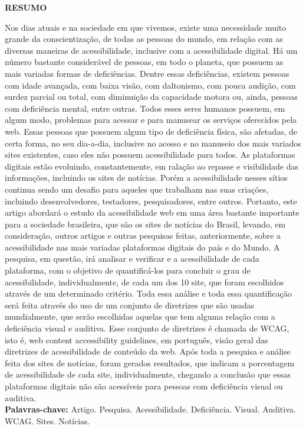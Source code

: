 \documentclass[a4paper]{article}
\begin{document}
\begin{titlepage}
	\begin{center}
		{\large \textbf{RESUMO}}\\[1cm]
	\end{center}
	Nos dias atuais e na sociedade em que vivemos, existe uma necessidade muito grande da conscientização, de todas as pessoas do mundo, em relação com as diversas maneiras de acessibilidade, inclusive com a acessibilidade digital. Há um número bastante considerável de pessoas, em todo o planeta, que possuem as mais variadas formas de deficiências. Dentre essas deficiências, existem pessoas com idade avançada, com baixa visão, com daltonismo, com pouca audição, com surdez parcial ou total, com diminuição da capacidade motora ou, ainda, pessoas com deficiência mental, entre outras. Todos esses seres humanos possuem, em algum modo, problemas para acessar e para manusear os serviços oferecidos pela web. Essas pessoas que possuem algum tipo de deficiência física, são afetadas, de certa forma, no seu dia-a-dia, inclusive no acesso e no manuseio dos mais variados sites existentes, caso eles não possuem acessibilidade para todos. As plataformas digitais estão evoluindo, constantemente, em ralação ao repasse e visibilidade das informações, incluindo os sites de notícias. Porém a acessibilidade nesses sítios continua sendo um desafio para aqueles que trabalham nas suas criações, incluindo desenvolvedores, testadores, pesquisadores, entre outros. Portanto, este artigo abordará o estudo da acessibilidade web em uma área bastante importante para a sociedade brasileira, que são os sites de notícias do Brasil, levando, em consideração, outros artigos e outras pesquisas feitas, anteriormente, sobre a acessibilidade nas mais variadas plataformas digitais do país e do Mundo. A pesquisa, em questão, irá analisar e verificar e a acessibilidade de cada plataforma, com o objetivo de quantificá-los para concluir o grau de acessibilidade, individualmente, de cada um dos 10 site, que foram escolhidos através de um determinado critério. Toda essa análise e toda essa quantificação será feita através do uso de um conjunto de diretrizes que são usadas mundialmente, que serão escolhidas aquelas que tem alguma relação com a deficiência visual e auditiva. Esse conjunto de diretrizes é chamada de WCAG, isto é, web content accessibility guidelines, em português, visão geral das diretrizes de acessibilidade de conteúdo da web. Após toda a pesquisa e análise feita dos sites de notícias, foram gerados resultados, que indicam a porcentagem de acessibilidade de cada site, individualmente, chegando a conclusão que essas plataformas digitais não são acessíveis para pessoas com deficiência visual ou auditiva.\\[1cm]
	{\large \textbf{Palavras-chave: }}Artigo. Pesquisa. Acessibilidade. Deficiência. Visual. Auditiva. WCAG. Sites. Notícias.\\[1cm]
\end{titlepage}
\end{document}
